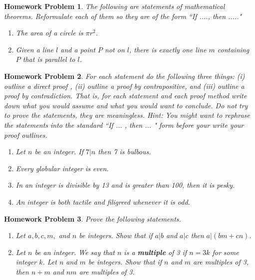 \documentclass{article}
\newtheorem{hw}{Homework Problem}
\begin{document}
	\underline{\hspace{5in}}

	\begin{hw}
		The following are statements of mathematical theorems. Reformulate each of them so they are of the form ``If ...., then ....."
		\begin{enumerate}
			\item[(1)] The area of a circle is $\pi r^2$.
			\item[(2)]  Given a line $l$ and a point $P$ not on $l$, there is exactly one line $m$ containing $P$ that is parallel to $l$.
		\end{enumerate}
	\end{hw}
	\begin{hw}\label{pf-outline}
		For each statement do the following three things:
		(i) outline a direct proof , (ii) outline a proof by contrapositive, and (iii) outline a proof by contradiction. That is, for each statement and each proof method write down what you would assume and what you would want to conclude. Do not try to prove the statements, they are meaningless. Hint: You might want to rephrase the statements into the standard ``If ... , then ... " form before your write your proof outlines.
		\begin{enumerate}
			\item Let $n$ be an integer. If $7 | n$ then 7 is bulbous.
			\item Every globular integer is even.
			\item In an integer is divisible by 13 and is greater than 100, then it is pesky.
			\item An integer is both tactile and filigreed whenever it is odd.
		\end{enumerate}
	\end{hw}
	\begin{hw}
		Prove the following statements.
		\begin{enumerate}
			\item Let $a, b, c, m,$ and $n$ be integers. Show that if $a|  b$ and $a|  c$ then $a|  (bm+cn)$.
			\item Let $n$ be an integer. We say that $n$ is a \textbf{multiple} of 3 if $n=3k$ for some integer $k$.
			Let  $n$ and $m$ be integers. Show that if $n$ and $m$ are multiples of 3, then $n+m$ and $nm$ are multiples of 3.
		\end{enumerate}
	\end{hw}
\end{document}
